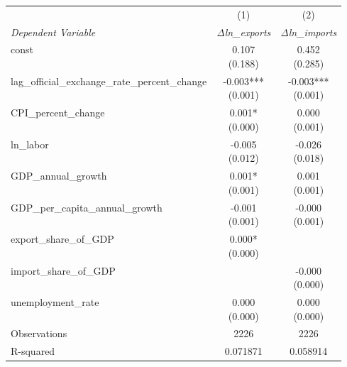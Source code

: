 \begin{tabular}{lcc}
\toprule
 & (1) & (2) \\
\textit{Dependent Variable} & \textit{Δln\_exports} & \textit{Δln\_imports} \\ 
\midrule

const & \makecell{0.107 \\ (0.188)} & \makecell{0.452 \\ (0.285)} \\
lag\_official\_exchange\_rate\_percent\_change & \makecell{-0.003*** \\ (0.001)} & \makecell{-0.003*** \\ (0.001)} \\
CPI\_percent\_change & \makecell{0.001* \\ (0.000)} & \makecell{0.000 \\ (0.001)} \\
ln\_labor & \makecell{-0.005 \\ (0.012)} & \makecell{-0.026 \\ (0.018)} \\
GDP\_annual\_growth & \makecell{0.001* \\ (0.001)} & \makecell{0.001 \\ (0.001)} \\
GDP\_per\_capita\_annual\_growth & \makecell{-0.001 \\ (0.001)} & \makecell{-0.000 \\ (0.001)} \\
export\_share\_of\_GDP & \makecell{0.000* \\ (0.000)} &  \\
import\_share\_of\_GDP &  & \makecell{-0.000 \\ (0.000)} \\
unemployment\_rate & \makecell{0.000 \\ (0.000)} & \makecell{0.000 \\ (0.000)} \\
Observations & 2226 & 2226 \\
R-squared & 0.071871 & 0.058914 \\
\bottomrule
\end{tabular}
